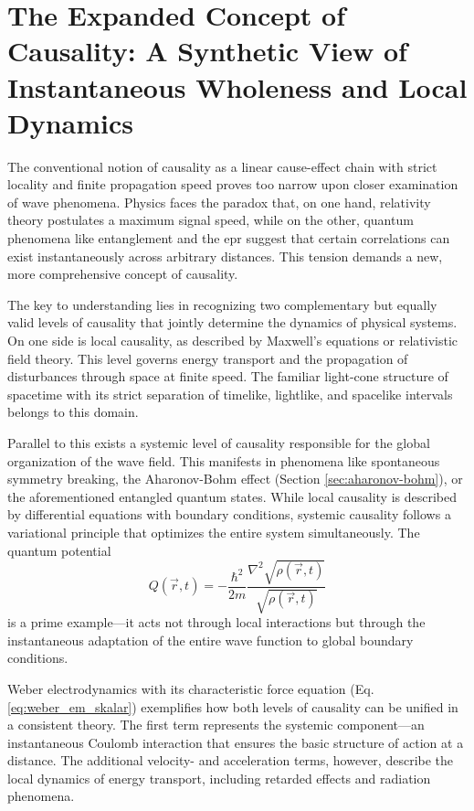 \section{The Expanded Concept of Causality: A Synthetic View of Instantaneous Wholeness and Local Dynamics}
The conventional notion of causality as a linear cause-effect chain with strict locality and finite propagation speed proves too narrow upon closer examination
of wave phenomena. Physics faces the paradox that, on one hand, relativity theory postulates a maximum signal speed, while on the other,
quantum phenomena like entanglement and the \gls{epr} \cite{EPR1935} suggest that certain correlations can exist instantaneously across arbitrary distances. This tension demands
a new, more comprehensive concept of causality.

The key to understanding lies in recognizing two complementary but equally valid levels of causality that jointly determine the dynamics of physical systems.
On one side is local causality, as described by Maxwell's equations or relativistic field theory. This level governs energy transport
and the propagation of disturbances through space at finite speed. The familiar light-cone structure of spacetime with its strict separation of timelike, lightlike, and
spacelike intervals belongs to this domain.

Parallel to this exists a systemic level of causality responsible for the global organization of the wave field. This manifests in phenomena like
spontaneous symmetry breaking, the Aharonov-Bohm effect (Section \ref{sec:aharonov-bohm}), or the aforementioned entangled quantum states. While local causality is described by differential equations with
boundary conditions, systemic causality follows a variational principle that optimizes the entire system simultaneously.
The quantum potential \cite{bohm1952}
\begin{equation}
    \label{eq:bohm_potenzial}
    Q(\vec{r},t) = -\frac{\hbar^2}{2m} \frac{\nabla^2 \sqrt{\rho(\vec{r},t)}}{\sqrt{\rho(\vec{r},t)}}
\end{equation}
is a prime example—it acts not through local interactions but through the instantaneous adaptation of the entire
wave function to global boundary conditions.

Weber electrodynamics with its characteristic force equation (Eq. \ref{eq:weber_em_skalar}) exemplifies how both levels of causality can be unified in a consistent theory.
The first term represents the systemic component—an instantaneous Coulomb interaction that ensures the basic structure of action at a distance. The additional velocity- and
acceleration terms, however, describe the local dynamics of energy transport, including retarded effects and radiation phenomena.

